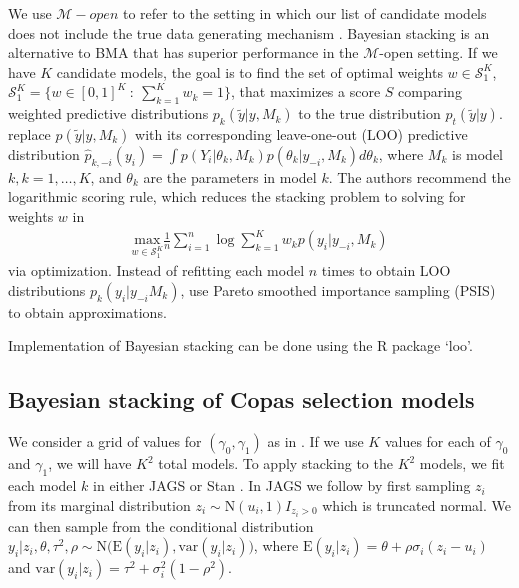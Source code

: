 \documentclass[12pt]{article}   	%
\numberwithin{equation}{section}
\begin{document}
We use $\mathcal{M}-open$ to refer to the setting in which our list of candidate models does not include the true data generating mechanism \citep{bernardo2009}. Bayesian stacking \citep{yao2018stacking} is an alternative to BMA that has superior performance in the $\mathcal{M}$-open setting. If we have $K$ candidate models, the goal is to find the set of optimal weights $w \in \mathcal{S}_1^K$, $\mathcal{S}_1^K = \{w \in [0,1]^K \: : \: \sum_{k = 1}^K w_k = 1\}$, that maximizes a score $S$ comparing weighted predictive distributions  $p_k(\tilde{y} \vert y, M_k)$ to the true distribution $p_t(\tilde{y} \vert y)$. \citet{yao2018stacking} replace $p(\tilde{y} \vert y, M_k)$ with its corresponding leave-one-out (LOO) predictive distribution $\hat{p}_{k, -i}(y_i) = \int p(Y_i \vert \theta_k, M_k) p(\theta_k \vert y_{-i}, M_k) d\theta_k$, where $M_k$ is model $k, k = 1, \dots, K$, and $\theta_k$ are the parameters in model $k$. The authors recommend the logarithmic scoring rule, which reduces the stacking problem to solving for weights $w$ in 
\begin{align}
\underset{w \in \mathcal{S}_1^K}{\mbox{max}} \frac{1}{n} \sum_{i = 1}^n \log \sum_{k = 1}^K w_k p(y_i \vert y_{-i}, M_k)
\end{align}
via optimization. 
Instead of refitting each model $n$ times to obtain LOO distributions ${p}_{k}(y_i \vert y_{-i} M_k)$, \citet{yao2018stacking} use Pareto smoothed importance sampling (PSIS) \citep{vehtari2017psis} to obtain approximations. 

Implementation of Bayesian stacking can be done using the R package `loo'. 

\subsection{Bayesian stacking of Copas selection models}

We consider a grid of values for $(\gamma_0, \gamma_1)$ as in \citet{copas2001sensitivity}. If we use $K$ values for each of $\gamma_0$ and $\gamma_1$, we will have $K^2$ total models. To apply stacking to the $K^2$ models, we fit each model $k$ in either JAGS \citep{plummer2003jags} or Stan \citep{gelman2015stan}. In JAGS we follow \citet{mavridis2013copas} by first sampling $z_i$ from its marginal distribution $z_i \sim \mbox{N}(u_i, 1) I_{z_i > 0}$ which is truncated normal. We can then sample from the conditional distribution $y_i \vert z_i, \theta, \tau^2, \rho \sim \mbox{N} \big( \mbox{E}(y_i \vert z_i), \mbox{var}(y_i \vert z_i) \big)$, where $\mbox{E}(y_i \vert z_i) = \theta + \rho \sigma_i (z_i - u_i)$ and $\mbox{var}(y_i \vert z_i) = \tau^2 + \sigma_i^2(1 - \rho^2)$. 
\end{document}
